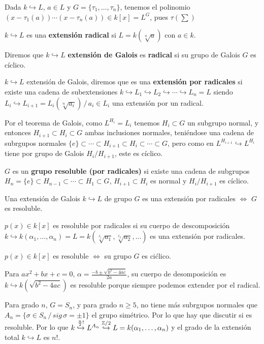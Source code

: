 \begin{obs}
    Dada $k \hookrightarrow L$, $a\in L$ y $G = \{ \tau_1, \ldots, \tau_n\}$, tenemos el polinomio $(x-\tau_1(a)) \cdots (x-\tau_n(a)) \in k[x] = L^G$, pues $\tau(\sum)$
\end{obs}\begin{defi}
    $k \hookrightarrow L$ es una \textbf{extensi\'on radical} si $L=k(\sqrt[n]{a})$ con $a\in k$. 
     \end{defi}
   \begin{defi} Diremos que $k \hookrightarrow L$ \textbf{extensi\'on de Galois} es \textbf{radical} si su grupo de Galois $G$ es c\'iclico.
 \end{defi}
   \begin{defi} $k \hookrightarrow L$ extensi\'on de Galois, diremos que es una \textbf{extensi\'on por radicales} si existe una cadena de subextensiones $k \hookrightarrow L_1 \hookrightarrow L_2 \hookrightarrow \cdots \hookrightarrow L_n = L$ siendo $L_i \hookrightarrow L_{i+1} = L_i(\sqrt[n]{a_i}) \, / \, a_i \in L_i$ una extensi\'on por un radical.
 \end{defi}
    Por el teorema de Galois, como $L^{H_i} = L_i$ tenemos $H_i \subset G$ un subgrupo normal, y entonces $H_{i+1} \subset H_i \subset G$ ambas inclusiones normales, teni\'endose una cadena de subrgupos normales $\{e\} \subset \cdots \subset H_{i+1} \subset H_i \subset \cdots \subset G$, pero como en $L^{H_{i+1}} \hookrightarrow L^{H_i}$ tiene por grupo de Galois $H_i / H_{i+1}$, este es c\'iclico.
 \begin{defi}
    $G$ es un \textbf{grupo resoluble (por radicales)} si existe una cadena de subgrupos $H_n = \{e\} \subset H_{n-1} \subset \cdots \subset H_1\subset G$, $H_{i+1} \subset H_i$ es normal y $H_i / H_{i+1}$ es c\'iclico. 
 \end{defi}
 \begin{teo}
    Una extensi\'on de Galois $k \hookrightarrow L$ de grupo $G$ es una extensi\'on por radicales $\iff$ $G$ es resoluble. 

    $p(x) \in k[x]$ es resoluble por radicales si su cuerpo de descomposici\'on $k \hookrightarrow k(\alpha_1, \ldots, \alpha_n)= L = k(\sqrt[\ell_1]{a_1}, \sqrt[\ell_2]{a_2}, \ldots)$ es una extensi\'on por radicales. 
    
    $p(x)\in k[x]$ es resoluble $\iff$ su grupo $G$ es ci\'clico.
 \end{teo}
 \begin{ejem}
    Para $ax^2+bx+c=0$, $\alpha = \frac{-b \pm \sqrt{b^2-4ac}}{2a}$, su cuerpo de desomposici\'on es $k \hookrightarrow k(\sqrt{b^2-4ac})$ es resoluble porque siempre podemos extender por el radical.

    Para grado $n$, $G=S_n$, y para grado $n\ge 5$, no tiene m\'as subrgupos normales que $A_n = \{\sigma \in S_n \, / \, sig \, \sigma = \pm 1\}$ el grupo sim\'etrico. Por lo que hay que discutir si es resoluble. Por lo que $k \overset{\frac{n}{2}!}{\hookrightarrow} L^{A_n} \overset{\mathbb{Z}/2}{\hookrightarrow} L = k(\alpha_1, \ldots, \alpha_n )$ y el grado de la extensi\'on total $k \hookrightarrow L$ es $n!$. 
 \end{ejem}
